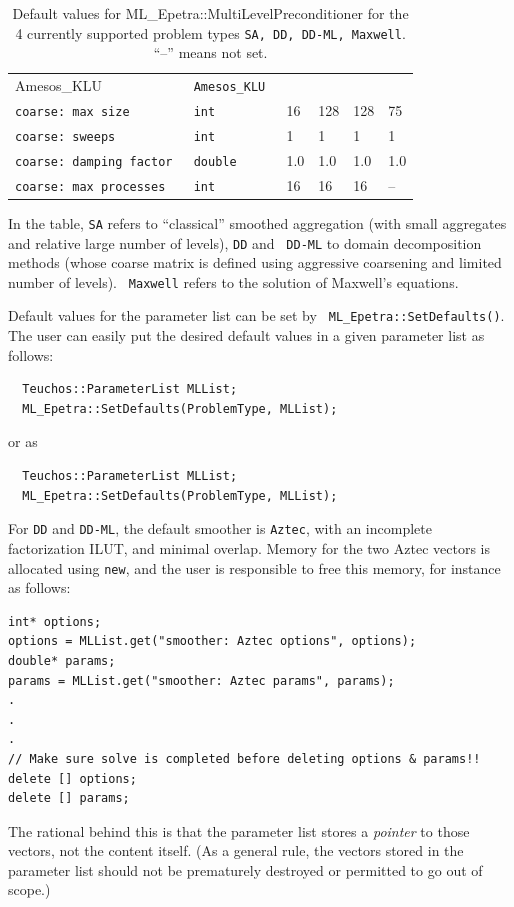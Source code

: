 \documentclass{article}[11pt]
\begin{document}
\begin{table}
\begin{tabular}{| p{7cm} | p{2.5cm} | p{2.5cm} | p{2.5cm} | p{2.5cm} |
    p{2.5cm} | }
Amesos\_KLU & \tt Amesos\_KLU \\
\tt coarse: max size & \tt int & 16 & 128 & 128 & 75 \\
\tt coarse: sweeps & \tt int & 1 & 1 & 1 & 1 \\
\tt coarse: damping factor & \tt double & 1.0 & 1.0 & 1.0 & 1.0 \\
\tt coarse: max processes & \tt int & 16 & 16 & 16 & -- \\
\hline
  \end{tabular}
  \caption{Default values for ML\_Epetra::MultiLevelPreconditioner for
    the 4 currently supported problem types {\tt SA, DD, DD-ML,
    Maxwell}. ``--'' means not set.}
  \label{tab:default}
\end{table}
%
In the table, {\tt SA} refers to ``classical'' smoothed aggregation (with
small aggregates and relative large number of levels), {\tt DD} and {\tt
  DD-ML} to domain decomposition methods (whose coarse matrix is defined
using aggressive coarsening and limited number of levels).  {\tt
  Maxwell} refers to the solution of Maxwell's equations. 

Default values for the parameter list can be set by {\tt
  ML\_Epetra::SetDefaults()}.  The user can easily put the desired
default values in a given parameter list as follows:
\begin{verbatim}
  Teuchos::ParameterList MLList;
  ML_Epetra::SetDefaults(ProblemType, MLList);
\end{verbatim}
or as
\begin{verbatim}
  Teuchos::ParameterList MLList;
  ML_Epetra::SetDefaults(ProblemType, MLList);
\end{verbatim}

For {\tt DD} and {\tt DD-ML}, the default smoother is {\tt Aztec},
with an incomplete factorization ILUT, and minimal overlap. 
Memory for the two {\sc Aztec} vectors is allocated using {\tt new}, and the
user is responsible to free this memory, for instance as follows:
\begin{verbatim}
int* options;
options = MLList.get("smoother: Aztec options", options);
double* params;
params = MLList.get("smoother: Aztec params", params);
.
.
.
// Make sure solve is completed before deleting options & params!!
delete [] options;
delete [] params;
\end{verbatim}
The rational behind this is that the parameter list stores a {\sl pointer} to those
vectors, not the content itself. (As a general rule, the vectors stored in the
parameter list should not
be prematurely destroyed or permitted to go out of scope.)
%
\end{document}
